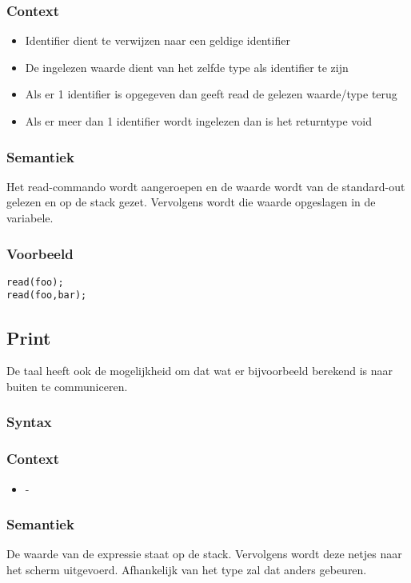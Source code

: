 \documentclass[]{article}
\begin{document}
\subsubsection{Context}
\begin{itemize}
\item Identifier dient te verwijzen naar een geldige identifier
\item De ingelezen waarde dient van het zelfde type als identifier te zijn
\item Als er 1 identifier is opgegeven dan geeft read de gelezen waarde/type terug
\item Als er meer dan 1 identifier wordt ingelezen dan is het returntype void
\end{itemize}
\subsubsection{Semantiek}
Het read-commando wordt aangeroepen en de waarde wordt van de standard-out gelezen en op de stack gezet. Vervolgens wordt die waarde opgeslagen in de variabele.
\subsubsection{Voorbeeld}
\begin{lstlisting}[style=SELMA]
read(foo);
read(foo,bar);
\end{lstlisting}

\subsection{Print}
De taal heeft ook de mogelijkheid om dat wat er bijvoorbeeld berekend is naar buiten te communiceren.
\subsubsection{Syntax}

\subsubsection{Context}
\begin{itemize}
\item -
\end{itemize}
\subsubsection{Semantiek}
De waarde van de expressie staat op de stack. Vervolgens wordt deze netjes naar het scherm uitgevoerd. Afhankelijk van het type zal dat anders gebeuren. 
\end{document}
